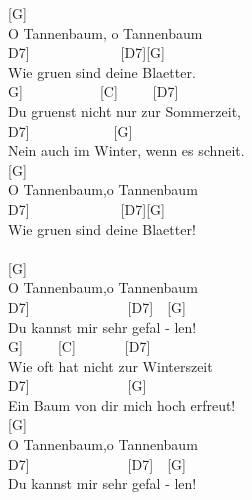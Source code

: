 \documentclass[
  letterpaper,
  a5paper]{memoir}
\begin{document}
{[}G{]}~~~~~~~~~~\\
O Tannenbaum, o Tannenbaum\\
\hspace*{0.333em}\hspace*{0.333em}\hspace*{0.333em}{[}D7{]}~~~~~~~~~~~~~{[}D7{]}{[}G{]}~~~~~~\\
Wie gruen sind deine Blaetter.\\
\hspace*{0.333em}\hspace*{0.333em}{[}G{]}~~~~~~~~~~~{[}C{]}~~~~~{[}D7{]}~~~~~\\
Du gruenst nicht nur zur Sommerzeit,\\
\hspace*{0.333em}\hspace*{0.333em}\hspace*{0.333em}\hspace*{0.333em}{[}D7{]}~~~~~~~~~~~~{[}G{]}~~~~~\\
Nein auch im Winter, wenn es schneit.\\
{[}G{]}~~~~~~\\
O Tannenbaum,o Tannenbaum\\
\hspace*{0.333em}\hspace*{0.333em}\hspace*{0.333em}{[}D7{]}~~~~~~~~~~~~~{[}D7{]}{[}G{]}~~~~~\\
Wie gruen sind deine Blaetter!\\
\hspace*{0.333em}\hspace*{0.333em}\\
{[}G{]}~~\\
O Tannenbaum,o Tannenbaum\\
\hspace*{0.333em}\hspace*{0.333em}{[}D7{]}~~~~~~~~~~~~~~{[}D7{]}~~{[}G{]}~~~~~~\\
Du kannst mir sehr gefal - len!\\
\hspace*{0.333em}\hspace*{0.333em}\hspace*{0.333em}{[}G{]}~~~~~{[}C{]}~~~~~~~{[}D7{]}~~~~~~~\\
Wie oft hat nicht zur Winterszeit\\
\hspace*{0.333em}\hspace*{0.333em}\hspace*{0.333em}{[}D7{]}~~~~~~~~~~~~~~{[}G{]}~~~~~\\
Ein Baum von dir mich hoch erfreut!\\
{[}G{]}~~\\
O Tannenbaum,o Tannenbaum\\
\hspace*{0.333em}\hspace*{0.333em}{[}D7{]}~~~~~~~~~~~~~~{[}D7{]}~~{[}G{]}~~~~~\\
Du kannst mir sehr gefal - len!
\end{document}
